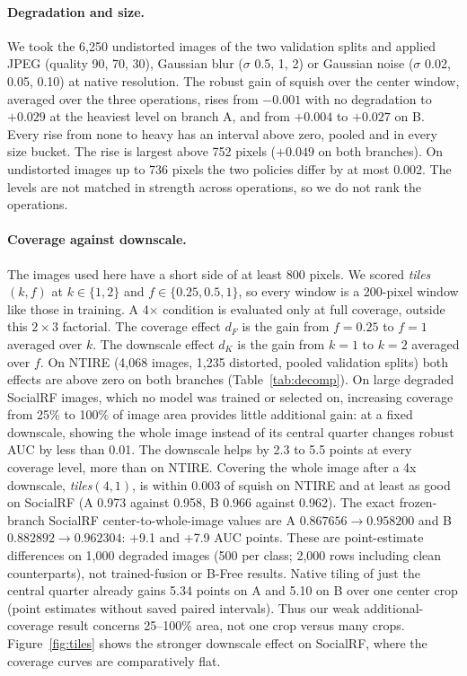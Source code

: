 \documentclass[letterpaper]{article} %
\begin{document}
\paragraph{Degradation and size.} We took the 6,250 undistorted images of the
two validation splits and applied JPEG (quality 90, 70, 30), Gaussian blur
($\sigma$ 0.5, 1, 2) or Gaussian noise ($\sigma$ 0.02, 0.05, 0.10) at native
resolution. The robust gain of squish over the center window, averaged over
the three operations, rises from $-0.001$ with no degradation to $+0.029$ at
the heaviest level on branch A, and from $+0.004$ to $+0.027$ on B. Every
rise from none to heavy has an interval above zero, pooled and in every size
bucket. The rise is largest above 752 pixels ($+0.049$ on both branches). On
undistorted images up to 736 pixels the two policies differ by at most
0.002. The levels are not matched in strength across operations, so we do
not rank the operations.

\paragraph{Coverage against downscale.} The images used here have a short
side of at least 800 pixels. We scored \emph{tiles}$(k, f)$ at
$k \in \{1, 2\}$ and $f \in \{0.25, 0.5, 1\}$, so every window is a
200-pixel window like those in training. A 4$\times$ condition is evaluated only at full coverage, outside this $2\times3$ factorial. The coverage effect $d_F$ is the
gain from $f = 0.25$ to $f = 1$ averaged over $k$. The downscale effect $d_K$
is the gain from $k = 1$ to $k = 2$ averaged over $f$. On NTIRE (4,068 images,
1,235 distorted, pooled validation splits) both effects are above zero on both branches
(Table~\ref{tab:decomp}). On large degraded SocialRF images, which no model
was trained or selected on, increasing coverage from 25\% to 100\% of image area provides little additional gain: at a fixed downscale,
showing the whole image instead of its central quarter changes robust AUC by
less than 0.01. The downscale helps by 2.3 to 5.5 points at every coverage
level, more than on NTIRE. Covering the whole image after a 4x downscale,
\emph{tiles}$(4, 1)$, is within 0.003 of squish on NTIRE and at least as good
on SocialRF (A 0.973 against 0.958, B 0.966 against 0.962).
The exact frozen-branch SocialRF center-to-whole-image values are A $0.867656\to0.958200$ and B $0.882892\to0.962304$: +9.1 and +7.9 AUC points. These are point-estimate differences on 1,000 degraded images (500 per class; 2,000 rows including clean counterparts), not trained-fusion or B-Free results. Native tiling of just the central quarter already gains 5.34 points on A and 5.10 on B over one center crop (point estimates without saved paired intervals). Thus our weak additional-coverage result concerns 25--100\% area, not one crop versus many crops.
Figure~\ref{fig:tiles} shows the stronger downscale effect on SocialRF,
where the coverage curves are comparatively flat.
\end{document}
